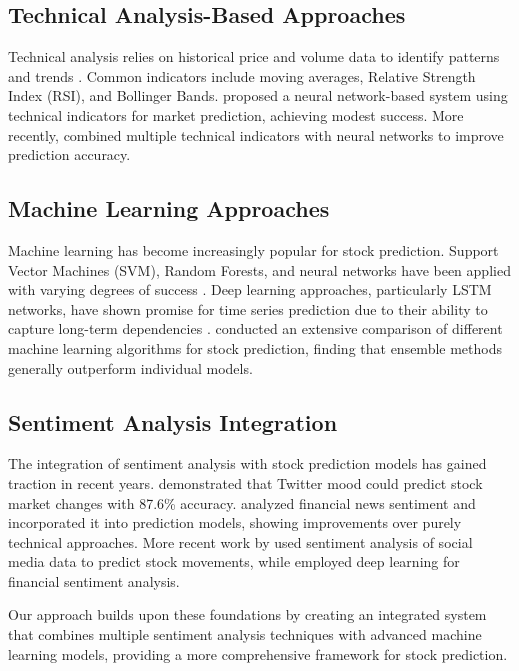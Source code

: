 \documentclass[review]{elsarticle}
\begin{document}
\subsection{Technical Analysis-Based Approaches}

Technical analysis relies on historical price and volume data to identify patterns and trends \citep{Murphy1999}. Common indicators include moving averages, Relative Strength Index (RSI), and Bollinger Bands. \cite{Lam2001} proposed a neural network-based system using technical indicators for market prediction, achieving modest success. More recently, \cite{Dash2016} combined multiple technical indicators with neural networks to improve prediction accuracy.

\subsection{Machine Learning Approaches}

Machine learning has become increasingly popular for stock prediction. Support Vector Machines (SVM), Random Forests, and neural networks have been applied with varying degrees of success \citep{Huang2005, Patel2015}. Deep learning approaches, particularly LSTM networks, have shown promise for time series prediction due to their ability to capture long-term dependencies \citep{Fischer2018, Selvin2017}. \cite{Krauss2017} conducted an extensive comparison of different machine learning algorithms for stock prediction, finding that ensemble methods generally outperform individual models.

\subsection{Sentiment Analysis Integration}

The integration of sentiment analysis with stock prediction models has gained traction in recent years. \cite{Bollen2011} demonstrated that Twitter mood could predict stock market changes with 87.6\% accuracy. \cite{Li2014} analyzed financial news sentiment and incorporated it into prediction models, showing improvements over purely technical approaches. More recent work by \cite{Pagolu2016} used sentiment analysis of social media data to predict stock movements, while \cite{Sohangir2018} employed deep learning for financial sentiment analysis.

Our approach builds upon these foundations by creating an integrated system that combines multiple sentiment analysis techniques with advanced machine learning models, providing a more comprehensive framework for stock prediction.
\end{document}
